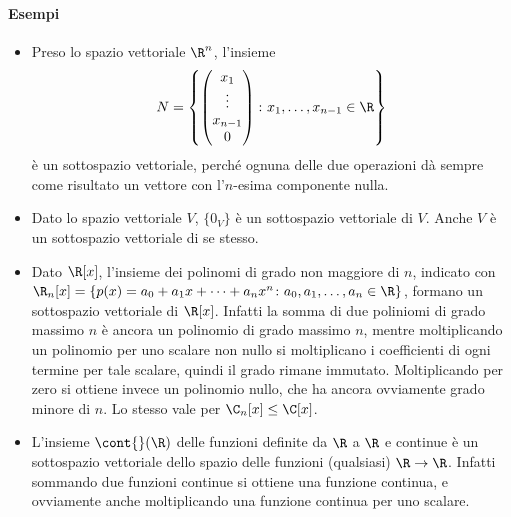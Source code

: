 \paragraph{Esempi}
\begin{itemize}
	\item Preso lo spazio vettoriale $\R^n$, l'insieme
		\begin{equation*}
			N=\left\{
			\begin{pmatrix}
				x_1\\\vdots\\x_{n-1}\\0
			\end{pmatrix}
			\colon x_1,\dots,x_{n-1}\in\R\right\}
		\end{equation*}
		è un sottospazio vettoriale, perché ognuna delle due operazioni dà sempre come risultato un vettore con l'$n$-esima componente nulla.
	\item Dato lo spazio vettoriale $V$, $\{0_V\}$ è un sottospazio vettoriale di $V$. Anche $V$ è un sottospazio vettoriale di se stesso.
	\item Dato $\R[x]$, l'insieme dei polinomi di grado non maggiore di $n$, indicato con $\R_n[x]=\{p(x)=a_0+a_1x+\dots+a_nx^n\colon a_0,a_1,\dots,a_n\in\R\}$, formano un sottospazio vettoriale di $\R[x]$.
		Infatti la somma di due poliniomi di grado massimo $n$ è ancora un polinomio di grado massimo $n$, mentre moltiplicando un polinomio per uno scalare non nullo si moltiplicano i coefficienti di ogni termine per tale scalare, quindi il grado rimane immutato.
		Moltiplicando per zero si ottiene invece un polinomio nullo, che ha ancora ovviamente grado minore di $n$.
		Lo stesso vale per $\C_n[x]\leq \C[x]$.
	\item L'insieme $\cont{}(\R)$ delle funzioni definite da $\R$ a $\R$ e continue è un sottospazio vettoriale dello spazio delle funzioni (qualsiasi) $\R\to\R$.
		Infatti sommando due funzioni continue si ottiene una funzione continua, e ovviamente anche moltiplicando una funzione continua per uno scalare.
\end{itemize}

